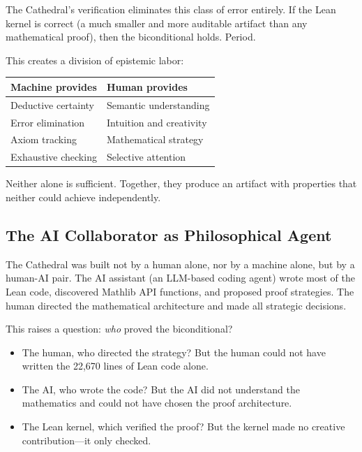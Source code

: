\documentclass[11pt,a4paper]{article}
\begin{document}
The Cathedral's verification eliminates this class of error entirely.
If the Lean kernel is correct (a much smaller and more auditable
artifact than any mathematical proof), then the biconditional holds.
Period.

This creates a division of epistemic labor:

\begin{center}
\begin{tabular}{@{}ll@{}}
\toprule
\textbf{Machine provides} & \textbf{Human provides} \\
\midrule
Deductive certainty & Semantic understanding \\
Error elimination & Intuition and creativity \\
Axiom tracking & Mathematical strategy \\
Exhaustive checking & Selective attention \\
\bottomrule
\end{tabular}
\end{center}

Neither alone is sufficient. Together, they produce an artifact with
properties that neither could achieve independently.

\subsection{The AI Collaborator as Philosophical Agent}

The Cathedral was built not by a human alone, nor by a machine alone,
but by a human-AI pair. The AI assistant (an LLM-based coding agent)
wrote most of the Lean code, discovered Mathlib API functions,
and proposed proof strategies. The human directed the mathematical
architecture and made all strategic decisions.

This raises a question: \emph{who} proved the biconditional?

\begin{itemize}
  \item The human, who directed the strategy? But the human could not
    have written the 22,670 lines of Lean code alone.
  \item The AI, who wrote the code? But the AI did not understand
    the mathematics and could not have chosen the proof architecture.
  \item The Lean kernel, which verified the proof? But the kernel
    made no creative contribution---it only checked.
\end{itemize}
\end{document}
